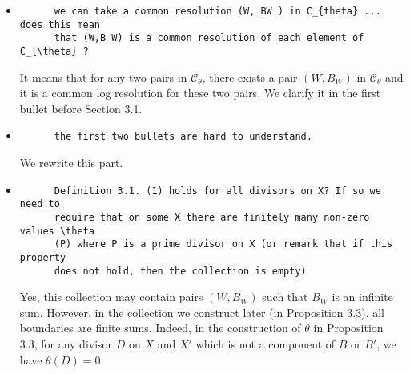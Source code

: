 \documentclass[11pt]{article}
\begin{document}
\begin{itemize}
  \bigskip
  
  \item \begin{verbatim}
      we can take a common resolution (W, BW ) in C_{theta} ... does this mean
      that (W,B_W) is a common resolution of each element of C_{\theta} ?
  \end{verbatim}
  It means that for any two pairs in $\mathcal{C}_\theta$, there exists a pair $(W,B_W)$ in $\mathcal{C}_{\theta}$ and it is a common log resolution for these two pairs. We clarify it in the first bullet before Section 3.1.
  
  \bigskip
  
  \item \begin{verbatim}
      the first two bullets are hard to understand.
  \end{verbatim}
  We rewrite this part. 
  
  \bigskip
  
  \item \begin{verbatim}
      Definition 3.1. (1) holds for all divisors on X? If so we need to 
      require that on some X there are finitely many non-zero values \theta 
      (P) where P is a prime divisor on X (or remark that if this property 
      does not hold, then the collection is empty)
  \end{verbatim}
  Yes, this collection may contain pairs $(W,B_W)$ such that $B_W$ is an infinite sum. However, in the collection we construct later (in Proposition 3.3), all boundaries are finite sums. Indeed, in the construction of $\theta$ in Proposition 3.3, for any divisor $D$ on $X$ and $X'$ which is not a component of $B$ or $B'$, we have $\theta(D)=0$.
  
  \bigskip
  

\end{itemize}
\end{document}
